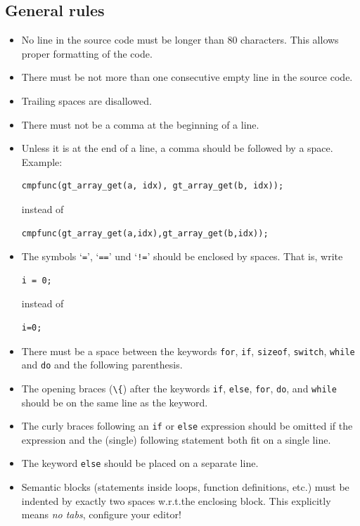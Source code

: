 \documentclass[11pt,final]{article}
\newcommand{\keyword}[1]{\lstinline{#1}}
\begin{document}
\subsection{General rules}
\begin{itemize}
\item
No line in the source code must be longer than 80 characters.
This allows proper formatting of the code.
\item
There must be not more than one consecutive empty line in the source code.
\item
Trailing spaces are disallowed.
\item
There must not be a comma at the beginning of a line.
\item
Unless it is at the end of a line, a comma should be followed by a space.
Example:

\begin{lstlisting}
cmpfunc(gt_array_get(a, idx), gt_array_get(b, idx));
\end{lstlisting}

instead of

\begin{lstlisting}
cmpfunc(gt_array_get(a,idx),gt_array_get(b,idx));
\end{lstlisting}

\item
The symbols `\keyword{=}', `\keyword{==}' und `\keyword{!=}' should be
enclosed by spaces. That is, write

\begin{lstlisting}
i = 0;
\end{lstlisting}

instead of

\begin{lstlisting}
i=0;
\end{lstlisting}
\item
There must be a space between the keywords \keyword{for}, \keyword{if},
\keyword{sizeof}, \keyword{switch}, \keyword{while} and \keyword{do} and the
following parenthesis.
\item
The opening braces (\keyword{\{}) after the keywords \keyword{if},
\keyword{else}, \keyword{for}, \keyword{do}, and \keyword{while} should be on
the same line as the keyword.
\item
The curly braces following an \keyword{if} or \keyword{else} expression should
be omitted if the expression and the (single) following statement both fit on
a single line.
\item
The keyword \keyword{else} should be placed on a separate line.
\item
Semantic blocks (statements inside loops, function definitions, etc.) must be
indented by exactly two spaces w.r.t.\@ the enclosing block.
This explicitly means \emph{no tabs}, configure your editor!


\end{itemize}
\end{document}
